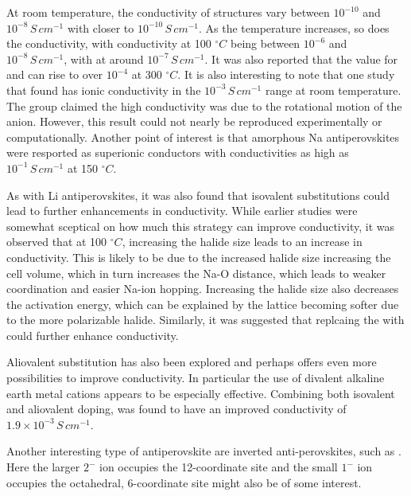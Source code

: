 \documentclass[10pt,a4paper, titlepage]{article}
\begin{document}
At room temperature, the conductivity of  structures vary between $10^{-10}$ and $10^{-8} \, S \, cm^{-1}$ with  closer to $10^{-10} \, S \, cm^{-1}$. 
As the temperature increases, so does the conductivity, with conductivity at 100 $^{\circ}C$ being between $10^{-6}$ and $10^{-8} \, S \, cm^{-1}$, with  at around $10^{-7} \, S \, cm^{-1}$. \cite{RN53} 
It was also reported that the value for  and  can rise to over $10^{-4}$ at 300 $^{\circ}C$. \cite{RN68} 
It is also interesting to note that one study that found  has ionic conductivity in the $10^{-3} \, S \, cm^{-1}$ range at room temperature. 
The group claimed the high conductivity was due to the rotational motion of the  anion. \cite{RN70}
However, this result could not nearly be reproduced experimentally or computationally. \cite{RN53}
Another point of interest is that amorphous Na antiperovskites were resported as superionic conductors with conductivities as high as $10^{-1} \, S \, cm^{-1}$ at 150 $^{\circ}C$. \cite{RN71}

As with Li antiperovskites, it was also found that isovalent substitutions could lead to further enhancements in conductivity.
While earlier studies were somewhat sceptical on how much this strategy can improve conductivity\cite{RN55}, it was observed that at 100 $^{\circ}C$, increasing the halide size leads to an increase in conductivity. \cite{RN53} 
This is likely to be due to the increased halide size increasing the cell volume, which in turn increases the Na-O distance, which leads to weaker coordination and easier Na-ion hopping. 
Increasing the halide size also decreases the activation energy, which can be explained by the lattice becoming softer due to the more polarizable halide.
Similarly, it was suggested that replcaing the  with  could further enhance conductivity. \cite{RN53}

Aliovalent substitution has also been explored and perhaps offers even more possibilities to improve conductivity.
In particular the use of divalent alkaline earth metal cations appears to be especially effective.
Combining both isovalent and aliovalent doping,  was found to have an improved conductivity of $1.9 \times 10^{-3} \, S \, cm^{-1}$. \cite{RN68}

Another interesting type of antiperovskite are inverted anti-perovskites, such as . 
Here the larger $2^-$ ion occupies the 12-coordinate site and the small $1^-$ ion occupies the octahedral, 6-coordinate site might also be of some interest. \cite{RN67}
\end{document}
